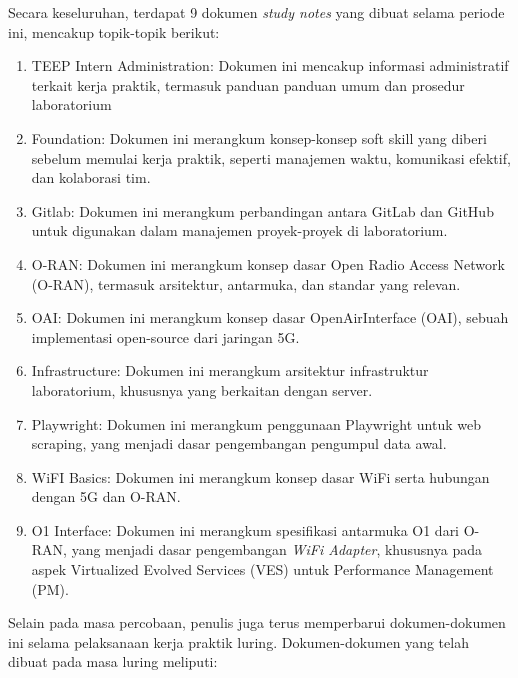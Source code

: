 Secara keseluruhan, terdapat 9 dokumen \textit{study notes} yang dibuat selama periode ini, mencakup topik-topik berikut:

\begin{enumerate}
    \item TEEP Intern Administration: Dokumen ini mencakup informasi administratif terkait kerja praktik, termasuk panduan panduan umum dan prosedur laboratorium
    \item Foundation: Dokumen ini merangkum konsep-konsep soft skill yang diberi sebelum memulai kerja praktik, seperti manajemen waktu, komunikasi efektif, dan kolaborasi tim.
    \item Gitlab: Dokumen ini merangkum perbandingan antara GitLab dan GitHub untuk digunakan dalam manajemen proyek-proyek di laboratorium.
    \item O-RAN: Dokumen ini merangkum konsep dasar Open Radio Access Network (O-RAN), termasuk arsitektur, antarmuka, dan standar yang relevan.
    \item OAI: Dokumen ini merangkum konsep dasar OpenAirInterface (OAI), sebuah implementasi open-source dari jaringan 5G.
    \item Infrastructure: Dokumen ini merangkum arsitektur infrastruktur laboratorium, khususnya yang berkaitan dengan server.
    \item Playwright: Dokumen ini merangkum penggunaan Playwright untuk web scraping, yang menjadi dasar pengembangan pengumpul data awal.
    \item WiFI Basics: Dokumen ini merangkum konsep dasar WiFi serta hubungan dengan 5G dan O-RAN.
    \item O1 Interface: Dokumen ini merangkum spesifikasi antarmuka O1 dari O-RAN, yang menjadi dasar pengembangan \textit{WiFi Adapter}, khususnya pada aspek Virtualized Evolved Services (VES) untuk Performance Management (PM).
\end{enumerate}

Selain pada masa percobaan, penulis juga terus memperbarui dokumen-dokumen ini selama pelaksanaan kerja praktik luring. Dokumen-dokumen yang telah dibuat pada masa luring meliputi:

